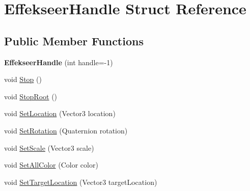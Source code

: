 \hypertarget{struct_effekseer_handle}{\section{Effekseer\-Handle Struct Reference}
\label{struct_effekseer_handle}
}
\subsection*{Public Member Functions}
\begin{DoxyCompactItemize}
\item 
\hypertarget{struct_effekseer_handle_ace59b89b09c1b0aefa13775e857b33dc}{{\bfseries Effekseer\-Handle} (int handle=-\/1)}\label{struct_effekseer_handle_ace59b89b09c1b0aefa13775e857b33dc}

\item 
void \hyperlink{struct_effekseer_handle_add31723e9d75fad60015c48dfe1bf785}{Stop} ()
\item 
void \hyperlink{struct_effekseer_handle_ae16184a6f1770d63edf941941b8ad063}{Stop\-Root} ()
\item 
void \hyperlink{struct_effekseer_handle_a65d631a161e475acac133b6db28d0070}{Set\-Location} (Vector3 location)
\item 
void \hyperlink{struct_effekseer_handle_a54be425dc9d059e66fe00799f34e25cf}{Set\-Rotation} (Quaternion rotation)
\item 
void \hyperlink{struct_effekseer_handle_a858d40ff7676ec5c2ae062596f52795b}{Set\-Scale} (Vector3 scale)
\item 
void \hyperlink{struct_effekseer_handle_a301f7e7c0dc9791a047a34bfb8e1702e}{Set\-All\-Color} (Color color)
\item 
void \hyperlink{struct_effekseer_handle_aa13ed72d63bdcf16ab9683261b92c855}{Set\-Target\-Location} (Vector3 target\-Location)
\end{DoxyCompactItemize}
